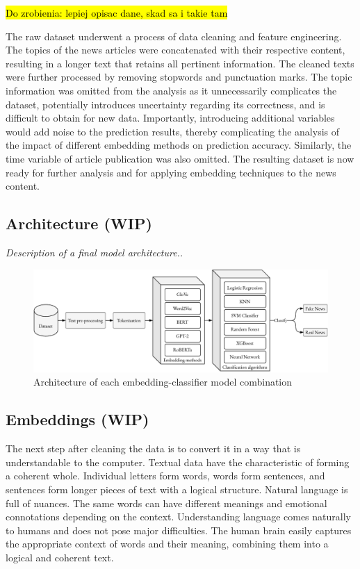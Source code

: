 \hl{Do zrobienia: lepiej opisac dane, skad sa i takie tam}

The raw dataset underwent a process of data cleaning and feature engineering. The topics of the news articles were concatenated with their respective content, resulting in a longer text that retains all pertinent information. The cleaned texts were further processed by removing stopwords and punctuation marks. The topic information was omitted from the analysis as it unnecessarily complicates the dataset, potentially introduces uncertainty regarding its correctness, and is difficult to obtain for new data. Importantly, introducing additional variables would add noise to the prediction results, thereby complicating the analysis of the impact of different embedding methods on prediction accuracy. Similarly, the time variable of article publication was also omitted. The resulting dataset is now ready for further analysis and for applying embedding techniques to the news content.

\subsection{Architecture (WIP)}
\textit{Description of a final model architecture..}

\begin{figure}
\centering
\includegraphics[width=0.8\linewidth]{methodology-schema_gpt2_extended.pdf}
\caption{Architecture of each embedding-classifier model combination}
\label{methodology-schema_extended}
\end{figure}


\subsection{Embeddings (WIP)}
The next step after cleaning the data is to convert it in a way that is understandable to the computer. Textual data have the characteristic of forming a coherent whole. Individual letters form words, words form sentences, and sentences form longer pieces of text with a logical structure. Natural language is full of nuances. The same words can have different meanings and emotional connotations depending on the context. Understanding language comes naturally to humans and does not pose major difficulties. The human brain easily captures the appropriate context of words and their meaning, combining them into a logical and coherent text.

